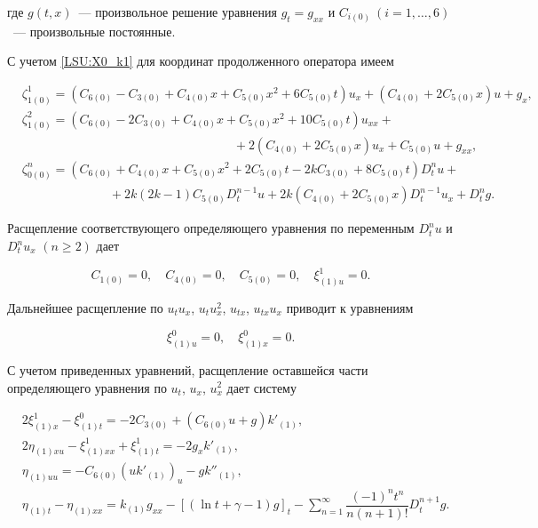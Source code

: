 где $g(t,x)$~--- произвольное решение уравнения $g_t=g_{xx}$ и $C_{i(0)} \ (i=1,\ldots, 6)$~--- произвольные постоянные.



С учетом \eqref{LSU:X0_k1} для координат продолженного оператора имеем

\begin{align*}

& \zeta^1_{1(0)} =(C_{6(0)}-C_{3(0)}+C_{4(0)} x +C_{5(0)} x^2 +6 C_{5(0)} t)u_x+(C_{4(0)}+2C_{5(0)} x)u +g_x, \\

& \zeta^2_{1(0)} =(C_{6(0)}-2C_{3(0)}+C_{4(0)} x +C_{5(0)} x^2 +10 C_{5(0)} t)u_{xx}+\\

& \qquad \qquad \qquad \qquad \qquad \qquad \qquad \qquad \quad  +2(C_{4(0)}+2C_{5(0)} x)u_x +C_{5(0)} u +g_{xx}, \\

& \zeta^n_{0(0)} = (C_{6(0)}+C_{4(0)} x +C_{5(0)} x^2 +2 C_{5(0)} t - 2kC_{3(0)}+8C_{5(0)}t) D^{n}_t u + \\

& \qquad \qquad \qquad  \quad  +2k(2k-1)C_{5(0)} D^{n-1}_t u +2k(C_{4(0)}+2C_{5(0)} x)D^{n-1}_t u_x +D^{n}_t g.

\end{align*}



Расщепление соответствующего определяющего уравнения по переменным $D^{n}_t u$ и $D^{n}_t u_x$ $(n \ge 2)$ дает

$$

C_{1(0)}=0, \quad C_{4(0)}=0, \quad C_{5(0)}=0, \quad \xi^1_{(1)u}=0. 

$$

Дальнейшее расщепление по $u_t u_x$, $u_t u_x^2$, $u_{tx}$, $u_{tx} u_x$ приводит к уравнениям

$$

\xi^0_{(1)u}=0, \quad \xi^0_{(1)x}=0. 

$$

С учетом приведенных уравнений, расщепление оставшейся части определяющего уравнения по $u_t$, $u_x$, $u_x^2$ дает систему

\begin{align*}

& 2 \xi^1_{(1)x}-\xi^0_{(1)t}=-2C_{3(0)}+(C_{6(0)} u+g)k'_{(1)}, \\

& 2 \eta_{(1)xu}-\xi^1_{(1)xx}+\xi^1_{(1)t}=-2g_x k'_{(1)}, \\

& \eta_{(1)uu}=-C_{6(0)} (u k'_{(1)})_{u} - g k''_{(1)}, \\

& \eta_{(1)t}-\eta_{(1)xx}=k_{(1)}g_{xx}-[(\ln t+\gamma-1)g]_t-\sum_{n=1}^{\infty} \dfrac{(-1)^n t^n}{n(n+1)!}D^{n+1}_t g.

\end{align*}




